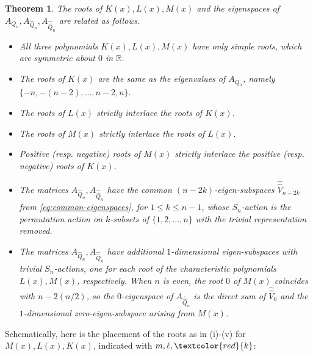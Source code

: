\documentclass[10pt]{amsart}
\theoremstyle{plain}
\newtheorem{theorem}[conjecture]{Theorem}
\newcommand{\RR}{\mathbb{R}}
\newcommand{\colorize}[1]{{\textcolor{red}{#1}}}
\begin{document}
\begin{theorem}
\label{thm:main}
The roots of $K(x), L(x), M(x)$
and the eigenspaces of $A_{Q_n}, A_{\hat{Q}_n},A_{\hat{\hat{Q}}_n}$ are related as follows.
\begin{itemize}

\item[(i)] 
All three polynomials $K(x), L(x), M(x)$
have only simple roots, which are symmetric about $0$ in $\RR$.


\item[(ii)]
The roots of $K(x)$ are the same as the eigenvalues of  $A_{Q_n}$, namely 
$
\{-n,-(n-2),\ldots,n-2,n\}.
$

\item[(iii)] The roots of $L(x)$ strictly interlace the roots of $K(x)$. 

\item[(iv)] The roots of $M(x)$ strictly interlace the roots of $L(x)$.

\item[(v)] Positive (resp. negative) roots of $M(x)$ strictly interlace the positive (resp. negative) roots of $K(x)$.

\item[(vi)] 
The matrices $A_{\hat{Q}_n},A_{\hat{\hat{Q}}_n}$ 
have the common $(n-2k)$-eigen-subspaces
$
\hat{\hat{V}}_{n-2k}
$
from \eqref{eq:common-eigenspaces}, for $1\leq k\leq n-1$,
whose $S_n$-action is the permutation action on $k$-subsets of $\{1,2,\ldots,n\}$ with the trivial representation removed.

\item[(vii)]
The matrices $A_{\hat{Q}_n},A_{\hat{\hat{Q}}_n}$ 
have additional $1$-dimensional eigen-subspaces with trivial $S_n$-actions, one for each root of the characteristic polynomials $L(x), M(x)$, respectively.  When $n$ is even, the root $0$ of $M(x)$ coincides with $n-2(n/2)$, so the $0$-eigenspace of $A_{\hat{\hat{Q}}_n}$ is the direct sum of $\hat{\hat{V}}_0$ and the $1$-dimensional zero-eigen-subspace arising from $M(x)$.


\end{itemize}
\end{theorem}

\noindent
Schematically, here is the placement of the roots as in (i)-(v) for
$M(x), L(x), K(x)$, indicated with $m,\ell,\colorize{k}$:
\end{document}

